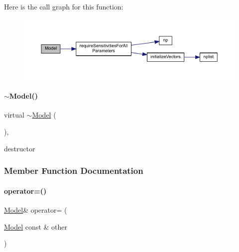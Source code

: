 Here is the call graph for this function\+:
\nopagebreak
\begin{figure}[H]
\begin{center}
\leavevmode
\includegraphics[width=350pt]{classamici_1_1_model_abd567a1612a8b947ca43c74df3b83273_cgraph}
\end{center}
\end{figure}
\mbox{\label{classamici_1_1_model_aae0d79bd804aefe47c7401520177f3e9}} 
\paragraph{\texorpdfstring{$\sim$Model()}{~Model()}}
{\footnotesize\ttfamily virtual $\sim$\mbox{\hyperlink{classamici_1_1_model}{Model}} (\begin{DoxyParamCaption}{ }\end{DoxyParamCaption})\hspace{0.3cm}{\ttfamily [virtual]}, {\ttfamily [default]}}

destructor 

\subsubsection{Member Function Documentation}
\mbox{\label{classamici_1_1_model_abcf360cf2836a5c7a7686a6a5c0c6bfa}} 
\paragraph{\texorpdfstring{operator=()}{operator=()}}
{\footnotesize\ttfamily \mbox{\hyperlink{classamici_1_1_model}{Model}}\& operator= (\begin{DoxyParamCaption}\item[{\mbox{\hyperlink{classamici_1_1_model}{Model}} const \&}]{other }\end{DoxyParamCaption})\hspace{0.3cm}{\ttfamily [delete]}}

